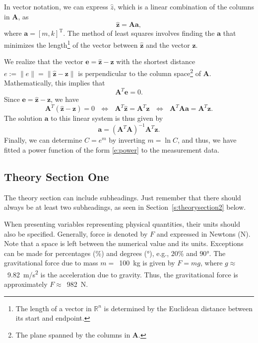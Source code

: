 \documentclass[a4paper]{article}
\begin{document}
%
In vector notation, we can express $\hat{z}$, which is a linear combination of the columns in $\mathbf{A}$, as
%
\begin{equation}\label{e:zhat}
    \mathbf{\hat{z}}=\mathbf{A}\mathbf{a},
\end{equation}
%
where $\mathbf{a}=[m,k]^\mathrm{T}$. The method of least squares involves finding the $\mathbf{a}$ that minimizes the length\footnote{The length of a vector in $\mathbb{R}^n$ is determined by the Euclidean distance between its start and endpoint.} of the vector between $\mathbf{\hat{z}}$ and the vector $\mathbf{z}$.

We realize that the vector $\mathbf{e}=\mathbf{\hat{z}}-\mathbf{z}$ with the shortest distance $e:=\|e\|=\|\mathbf{\hat{z}}-\mathbf{z}\|$ is perpendicular to the column space\footnote{The plane spanned by the columns in $\mathbf{A}$.} of $\mathbf{A}$. Mathematically, this implies that
%
\begin{equation}\label{e:ATe}
    \mathbf{A}^{T}\mathbf{e}=0.
\end{equation}
%
Since $\mathbf{e}=\mathbf{\hat{z}}-\mathbf{z}$, we have
%
\begin{equation}\label{e:ATe1}
    \mathbf{A}^{T}\left(\mathbf{\hat{z}}-\mathbf{z}\right)=0
    ~~~ \Longleftrightarrow ~~~
    \mathbf{A}^{T}\mathbf{\hat{z}}=\mathbf{A}^{T}\mathbf{z}
    ~~~ \Longleftrightarrow ~~~
    \mathbf{A}^{T}\mathbf{A}\mathbf{a}=\mathbf{A}^{T}\mathbf{z}.
\end{equation}
%
The solution $\mathbf{a}$ to this linear system is thus given by
%
\begin{equation}\label{e:a}
    \mathbf{a}=\left(\mathbf{A}^{T}\mathbf{A}\right)^{-1}\mathbf{A}^{T}\mathbf{z}.
\end{equation}
%
Finally, we can determine $C=e^m$ by inverting $m=\ln C$, and thus, we have fitted a power function of the form \eqref{e:power} to the measurement data.

\subsection{Theory Section One}
The theory section can include subheadings. Just remember that there should always be at least two subheadings, as seen in Section~\ref{s:theorysection2} below.

When presenting variables representing physical quantities, their units should also be specified. Generally, force is denoted by $F$ and expressed in Newtons (\si{\newton}). Note that a space is left between the numerical value and its units. Exceptions can be made for percentages (\%) and degrees (\si{\degree}), e.g., $20$\% and $90$\si{\degree}. The gravitational force due to mass $m=$~\SI{100}{\kilo\gram} is given by $F=mg$, where $g\approx$~\SI{9.82}{\metre/\second\squared} is the acceleration due to gravity. Thus, the gravitational force is approximately $F\approx$~\SI{982}{\newton}.
\end{document}
